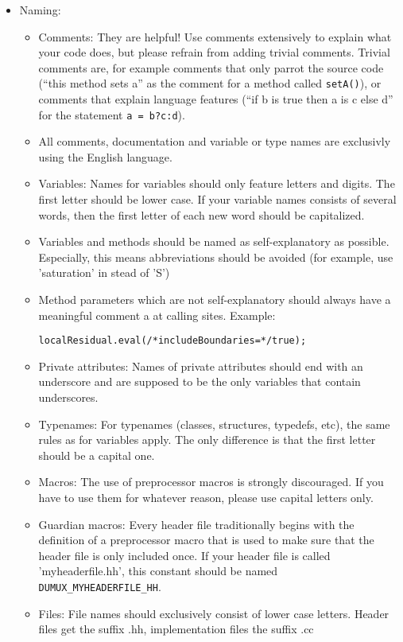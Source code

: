 \begin{itemize}
\item Naming: 
\begin{itemize}
\item Comments: They are helpful! Use comments extensively to explain
  what your code does, but please refrain from adding trivial
  comments. Trivial comments are, for example comments that only
  parrot the source code (``this method sets a'' as the comment for a
  method called \texttt{setA()}), or comments that explain language
  features (``if b is true then a is c else d'' for the statement
  \texttt{a = b?c:d}).
\item All comments, documentation and variable or type names are
  exclusivly using the English language.
\item Variables: Names for variables should only feature letters and
  digits. The first letter should be lower case. If your variable
  names consists of several words, then the first letter of each new
  word should be capitalized.
\item Variables and methods should be named as self-explanatory as
  possible. Especially, this means abbreviations should be avoided
  (for example, use 'saturation' in stead of 'S')
\item Method parameters which are not self-explanatory should always
  have a meaningful comment a at calling sites. Example:
\begin{lstlisting}[style=eWomsCode]
   localResidual.eval(/*includeBoundaries=*/true);
\end{lstlisting}
\item Private attributes: Names of private attributes should end with
  an underscore and are supposed to be the only variables that contain
  underscores.
\item Typenames: For typenames (classes, structures, typedefs, etc),
  the same rules as for variables apply. The only difference is that
  the first letter should be a capital one.
\item Macros: The use of preprocessor macros is strongly
  discouraged. If you have to use them for whatever reason, please use
  capital letters only.
\item Guardian macros: Every header file traditionally begins with the
  definition of a preprocessor macro that is used to make sure that
  the header file is only included once. If your header file is
  called 'myheaderfile.hh', this constant should be named
  \texttt{DUMUX\_MYHEADERFILE\_HH}.
\item Files: File names should exclusively consist of lower case
  letters. Header files get the suffix .hh, implementation files the
  suffix .cc
\end{itemize}


\end{itemize}

